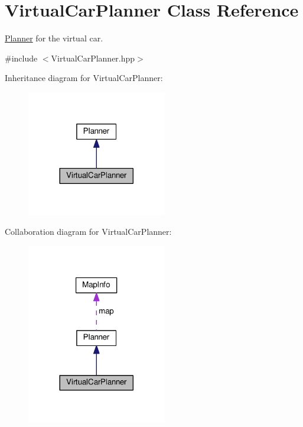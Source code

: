 \hypertarget{classVirtualCarPlanner}{}\section{Virtual\+Car\+Planner Class Reference}
\label{classVirtualCarPlanner}


\hyperlink{classPlanner}{Planner} for the virtual car.  




{\ttfamily \#include $<$Virtual\+Car\+Planner.\+hpp$>$}



Inheritance diagram for Virtual\+Car\+Planner\+:\nopagebreak
\begin{figure}[H]
\begin{center}
\leavevmode
\includegraphics[width=173pt]{classVirtualCarPlanner__inherit__graph}
\end{center}
\end{figure}


Collaboration diagram for Virtual\+Car\+Planner\+:\nopagebreak
\begin{figure}[H]
\begin{center}
\leavevmode
\includegraphics[width=173pt]{classVirtualCarPlanner__coll__graph}
\end{center}
\end{figure}
